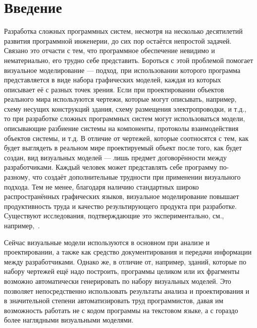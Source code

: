 \chapter*{Введение}
Разработка сложных программных систем, несмотря на несколько десятилетий 
развития программной инженерии, до сих пор остаётся непростой задачей. 
Связано это отчасти с тем, что программное обеспечение невидимо и нематериально, 
его трудно себе представить. Бороться с этой проблемой помогает визуальное 
моделирование --- подход, при использовании которого программа представляется в 
виде набора графических моделей, каждая из которых описывает её с разных точек 
зрения. Если при проектировании объектов реального мира используются чертежи, 
которые могут описывать, например, схему несущих конструкций здания, схему 
размещения электропроводки, и т.д., то при разработке сложных программных 
систем могут использоваться модели, описывающие разбиение системы на компоненты, 
протоколы взаимодействия объектов системы, и т.д. В отличие от чертежей, которые 
соотносятся с тем, как будет выглядеть в реальном мире проектируемый объект 
после того, как будет создан, вид визуальных моделей --- лишь предмет 
договорённости между разработчиками. Каждый человек может представлять себе 
программу по-разному, что создаёт дополнительные трудности при применении 
визуального подхода. Тем не менее, благодаря наличию стандартных широко 
распространённых графических языков, визуальное моделирование повышает 
продуктивность труда и качество результирующего продукта при разработке. 
Существуют исследования, подтверждающие это экспериментально, см., 
например,~\cite{heijstek2009empirical, baker2005model}.

Сейчас визуальные модели используются в основном при анализе и проектировании, 
а также как средство документирования и передачи информации между 
разработчиками. Однако же, в отличие от, например, зданий, которые по набору 
чертежей ещё надо построить, программы целиком или их фрагменты возможно 
автоматически генерировать по набору визуальных моделей. Это позволяет 
непосредственно использовать результаты анализа и проектирования и в 
значительной степени автоматизировать труд программистов, давая им возможность 
работать не с кодом программы на текстовом языке, а с гораздо более наглядными 
визуальными моделями. 

